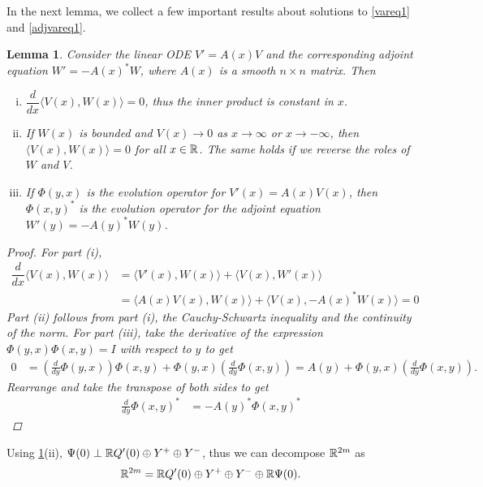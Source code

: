 \documentclass[10pt,reqno]{amsart}
\theoremstyle{plain}
\newtheorem{lemma}[theorem]{Lemma}
\theoremstyle{definition}
\theoremstyle{remark}
\numberwithin{theorem}{section}
\numberwithin{equation}{section}
\begin{document}
In the next lemma, we collect a few important results about solutions to \cref{vareq1} and \cref{adjvareq1}.

\begin{lemma}\label{eigadjoint}
Consider the linear ODE $V' = A(x)V$ and the corresponding adjoint equation $W' = -A(x)^* W$, where $A(x)$ is a smooth $n \times n$ matrix. Then
\begin{enumerate}[(i)]
\item $\dfrac{d}{dx}\langle V(x), W(x) \rangle = 0$, thus the inner product is constant in $x$.
\item If $W(x)$ is bounded and $V(x) \rightarrow 0$ as $x \rightarrow \infty$ or $x \rightarrow -\infty$, then $\langle V(x), W(x) \rangle = 0$ for all $x \in \mathbb{R}$. The same holds if we reverse the roles of $W$ and $V$.
\item If $\Phi(y, x)$ is the evolution operator for $V'(x) = A(x)V(x)$, then $\Phi(x, y)^*$ is the evolution operator for the adjoint equation $W'(y) = -A(y)^* W(y)$.
\end{enumerate}
\begin{proof}
For part (i), 
\begin{align*}
\dfrac{d}{dx}\langle V(x), W(x) \rangle &= 
\langle V'(x), W(x) \rangle + \langle V(x), W'(x) \rangle \\
&= \langle A(x)V(x), W(x) \rangle + \langle V(x), -A(x)^* W(x) \rangle = 0
\end{align*}
Part (ii) follows from part (i), the Cauchy-Schwartz inequality and the continuity of the norm. For part (iii), take the derivative of the expression $\Phi(y, x)\Phi(x, y) = I$ with respect to $y$ to get
\begin{align*}
0 &= \left(\frac{d}{dy}\Phi(y, x)\right) \Phi(x, y) +
\Phi(y, x)\left(\frac{d}{dy}\Phi(x, y)\right) 
= A(y) + \Phi(y, x)\left(\frac{d}{dy}\Phi(x, y)\right).
\end{align*}
Rearrange and take the transpose of both sides to get
\begin{align*}
\frac{d}{dy}\Phi(x, y)^* &= -A(y)^* \Phi(x, y)^*  
\end{align*}
\end{proof}
\end{lemma}

\noi Using \cref{eigadjoint}(ii), $\Psi(0) \perp \mathbb{R} Q'(0) \oplus Y^+ \oplus Y^-$, thus we can decompose $\mathbb{R}^{2m}$ as
\begin{equation}\label{R2mdecomp}
\mathbb{R}^{2m} = \mathbb{R} Q'(0) \oplus Y^+ \oplus Y^- \oplus \mathbb{R} \Psi(0).
\end{equation}
\end{document}

